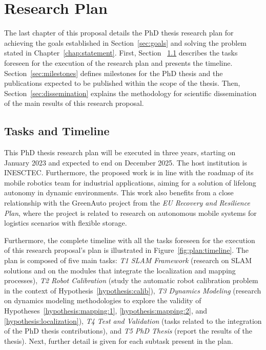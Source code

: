 \chapter{Research Plan}\label{chap:plan}

The last chapter of this proposal details the PhD thesis research plan for achieving the goals established in Section~\ref{sec:goals} and solving the problem stated in Chapter~\ref{chap:statement}.
First, Section ~\ref{sec:tasks} describes the tasks foreseen for the execution of the research plan and presents the timeline.
Section~\ref{sec:milestones} defines milestones for the PhD thesis and the publications expected to be published within the scope of the thesis.
Then, Section~\ref{sec:dissemination} explains the methodology for scientific dissemination of the main results of this research proposal.






\section{Tasks and Timeline}\label{sec:tasks}

This PhD thesis research plan will be executed in three years, starting on January 2023 and expected to end on December 2025. The host institution is \gls{INESCTEC}.
Furthermore, the proposed work is in line with the roadmap of its mobile robotics team for industrial applications, aiming for a solution of lifelong autonomy in dynamic environments.
This work also benefits from a close relationship with the GreenAuto project from the \textit{\gls{EU} Recovery and Resilience Plan}, where the project is related to research on autonomous mobile systems for logistics scenarios with flexible storage.

Furthermore, the complete timeline with all the tasks foreseen for the execution of this research proposal's plan is illustrated in Figure~\ref{fig:plan:timeline}. The plan is composed of five main tasks:
\textit{T1 \gls{SLAM} Framework} (research on \gls{SLAM} solutions and on the modules that integrate the localization and mapping processes),
\textit{T2 Robot Calibration} (study the automatic robot calibration problem in the context of Hypothesis~\ref{hypothesis:calib}),
\textit{T3 Dynamics Modeling} (research on dynamics modeling methodologies to explore the validity of Hypotheses~\ref{hypothesis:mapping:1}, \ref{hypothesis:mapping:2}, and \ref{hypothesis:localization}),
\textit{T4 Test and Validation} (tasks related to the integration of the PhD thesis contributions),
and \textit{T5 PhD Thesis} (report the results of the thesis).
Next, further detail is given for each subtask present in the plan.

